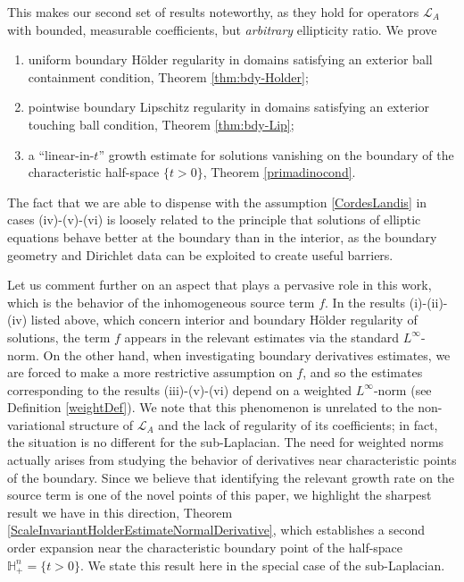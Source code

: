 \documentclass[12pt]{amsart}
\newcommand{\Lop}{\mathcal{L}}
\def \H {{\mathbb H}}
\def \L {\mathcal{L}}
\begin{document}
This makes our second set of results noteworthy, as they hold for operators $\L_A$ with bounded, measurable coefficients, but \emph{arbitrary} ellipticity ratio. We prove
\begin{enumerate}
\item[(iv)] uniform boundary H\"older regularity in domains satisfying an exterior ball containment condition, Theorem \ref{thm:bdy-Holder};
\item[(v)] pointwise boundary Lipschitz regularity in domains satisfying an exterior touching ball condition, Theorem \ref{thm:bdy-Lip};
\item[(vi)] a ``linear-in-$t$'' growth estimate for solutions vanishing on the boundary of the characteristic half-space $\{t > 0\}$, Theorem \ref{primadinocond}.
\end{enumerate}

The fact that we are able to dispense with the assumption \eqref{CordesLandis} in cases (iv)-(v)-(vi) is loosely related to the principle that solutions of elliptic equations behave better at the boundary than in the interior, as the boundary geometry and Dirichlet data can be exploited to create useful barriers. 

Let us comment further on an aspect that plays a pervasive role in this work, which is the behavior of the inhomogeneous source term $f$. In the results (i)-(ii)-(iv) listed above, which concern interior and boundary H\"older regularity of solutions, the term $f$ appears in the relevant estimates via the standard $L^\infty$-norm. On the other hand, when investigating boundary derivatives estimates, we are forced to make a more restrictive assumption on $f$, and so the estimates corresponding to the results (iii)-(v)-(vi) depend on a weighted $L^\infty$-norm (see Definition \ref{weightDef}). We note that this phenomenon is unrelated to the non-variational structure of $\Lop_A$ and the lack of regularity of its coefficients; in fact, the situation is no different for the sub-Laplacian. The need for weighted norms actually arises from studying the behavior of derivatives near characteristic points of the boundary. Since we believe that identifying the relevant growth rate on the source term is one of the novel points of this paper, we highlight the sharpest result we have in this direction, Theorem \ref{ScaleInvariantHolderEstimateNormalDerivative}, which establishes a second order expansion near the characteristic boundary point of the half-space $\H^n_+=\{t>0\}$. We state this result here in the special case of the sub-Laplacian.
\end{document}
